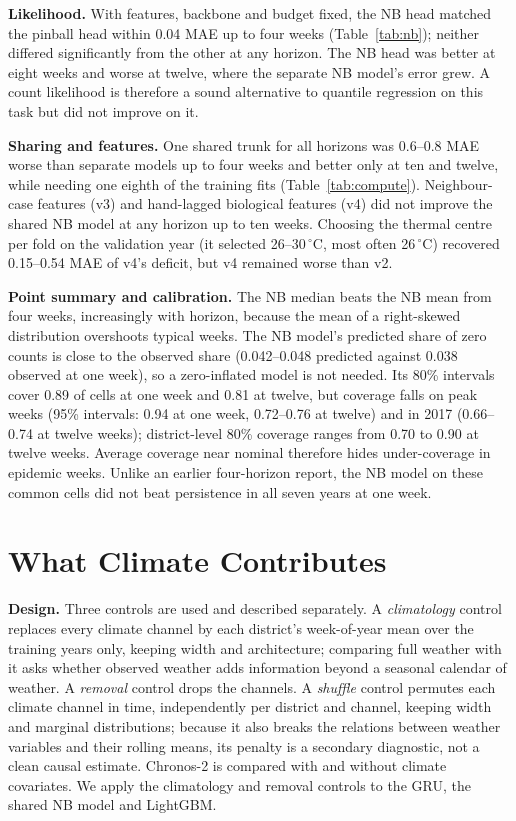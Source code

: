\textbf{Likelihood.} With features, backbone and budget fixed, the NB head matched the pinball head within 0.04 MAE up to four weeks (Table~\ref{tab:nb}); neither differed significantly from the other at any horizon. The NB head was better at eight weeks and worse at twelve, where the separate NB model's error grew. A count likelihood is therefore a sound alternative to quantile regression on this task but did not improve on it.

\textbf{Sharing and features.} One shared trunk for all horizons was 0.6--0.8 MAE worse than separate models up to four weeks and better only at ten and twelve, while needing one eighth of the training fits (Table~\ref{tab:compute}). Neighbour-case features (v3) and hand-lagged biological features (v4) did not improve the shared NB model at any horizon up to ten weeks. Choosing the thermal centre per fold on the validation year (it selected 26--30\,$^\circ$C, most often 26\,$^\circ$C) recovered 0.15--0.54 MAE of v4's deficit, but v4 remained worse than v2.

\textbf{Point summary and calibration.} The NB median beats the NB mean from four weeks, increasingly with horizon, because the mean of a right-skewed distribution overshoots typical weeks. The NB model's predicted share of zero counts is close to the observed share (0.042--0.048 predicted against 0.038 observed at one week), so a zero-inflated model is not needed. Its 80\% intervals cover 0.89 of cells at one week and 0.81 at twelve, but coverage falls on peak weeks (95\% intervals: 0.94 at one week, 0.72--0.76 at twelve) and in 2017 (0.66--0.74 at twelve weeks); district-level 80\% coverage ranges from 0.70 to 0.90 at twelve weeks. Average coverage near nominal therefore hides under-coverage in epidemic weeks. Unlike an earlier four-horizon report, the NB model on these common cells did not beat persistence in all seven years at one week.

\section{What Climate Contributes}
\label{sec:climate}

\textbf{Design.} Three controls are used and described separately. A \emph{climatology} control replaces every climate channel by each district's week-of-year mean over the training years only, keeping width and architecture; comparing full weather with it asks whether observed weather adds information beyond a seasonal calendar of weather. A \emph{removal} control drops the channels. A \emph{shuffle} control permutes each climate channel in time, independently per district and channel, keeping width and marginal distributions; because it also breaks the relations between weather variables and their rolling means, its penalty is a secondary diagnostic, not a clean causal estimate. Chronos-2 is compared with and without climate covariates. We apply the climatology and removal controls to the GRU, the shared NB model and LightGBM.

